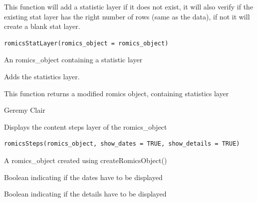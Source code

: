 \documentclass[a4paper]{book}
\begin{document}
%
\begin{Description}
This function will add a statistic layer if it does not exist, it will also verify if the existing stat layer has the right number of rows (same as the data), if not it will create a blank stat layer.
\end{Description}
%
\begin{Usage}
\begin{verbatim}
romicsStatLayer(romics_object = romics_object)
\end{verbatim}
\end{Usage}
%
\begin{Arguments}
\begin{ldescription}
\item[\code{romics\_object}] An romics\_object containing a statistic layer
\end{ldescription}
\end{Arguments}
%
\begin{Details}
Adds the statistics layer.
\end{Details}
%
\begin{Value}
This function returns a modified romics object, containing statistics layer
\end{Value}
%
\begin{Author}
Geremy Clair
\end{Author}
%
\begin{Description}
Displays the content steps layer of the romics\_object
\end{Description}
%
\begin{Usage}
\begin{verbatim}
romicsSteps(romics_object, show_dates = TRUE, show_details = TRUE)
\end{verbatim}
\end{Usage}
%
\begin{Arguments}
\begin{ldescription}
\item[\code{romics\_object}] A romics\_object created using createRomicsObject()

\item[\code{show\_dates}] Boolean indicating if the dates have to be displayed

\item[\code{show\_details}] Boolean indicating if the details have to be displayed
\end{ldescription}
\end{Arguments}
\end{document}
